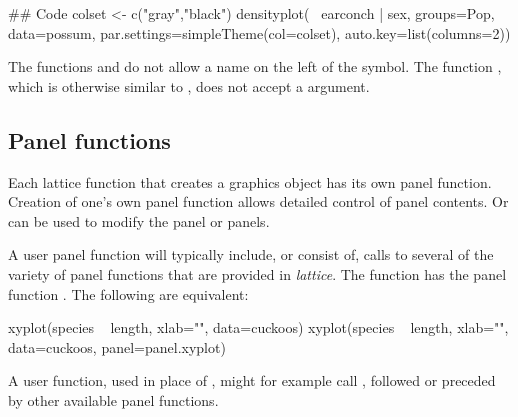 \begin{Schunk}
\begin{Sinput}
## Code
colset <- c("gray","black")
densityplot(~ earconch | sex, groups=Pop,
            data=possum,
            par.settings=simpleTheme(col=colset),
            auto.key=list(columns=2))
\end{Sinput}
\end{Schunk}
The functions  and  do not
allow a name on the left of the \txtt{$\sim$} symbol. The function
, which is otherwise similar to ,
does not accept a  argument.

\subsection{Panel functions}\label{ss:panel}

  Each lattice function that creates a graphics
object has its own panel function.  Creation of one's own panel
function allows detailed control of panel contents. Or 
can be used to modify the panel or panels.

A user panel function will typically include, or consist of, calls to
several of the variety of panel functions that are provided in
\textit{lattice}.  The function  has the panel function
.  The following are equivalent:
\begin{Schunk}
\begin{Sinput}
xyplot(species ~ length, xlab="", data=cuckoos)
xyplot(species ~ length, xlab="", data=cuckoos,
       panel=panel.xyplot)
\end{Sinput}
\end{Schunk}
\noindent
A user function, used in place of ,
might for example call ,
followed or preceded by other available panel functions.

